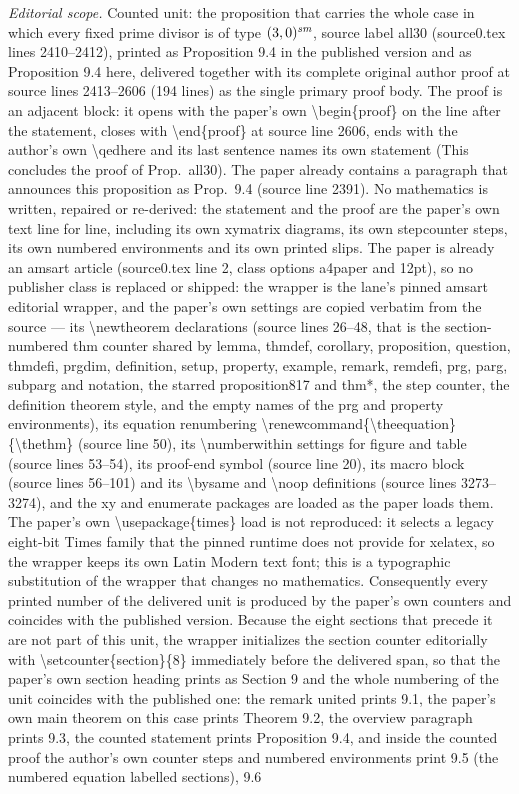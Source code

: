 \documentclass[10pt,a4paper]{amsart}
\theoremstyle{definition}
\numberwithin{figure}{section}
\numberwithin{table}{section}
\newcommand{\sm}{\text{\it sm}}
\begin{document}
\noindent\textit{Editorial scope.} Counted unit: the proposition that carries the whole case in which every fixed prime divisor is of type $(3,0)^{\sm}$, source label all30 (source0.tex lines 2410--2412), printed as Proposition 9.4 in the published version and as Proposition 9.4 here, delivered together with its complete original author proof at source lines 2413--2606 (194 lines) as the single primary proof body. The proof is an adjacent block: it opens with the paper's own \textbackslash{}begin\{proof\} on the line after the statement, closes with \textbackslash{}end\{proof\} at source line 2606, ends with the author's own \textbackslash{}qedhere and its last sentence names its own statement (This concludes the proof of Prop.~all30). The paper already contains a paragraph that announces this proposition as Prop.~9.4 (source line 2391). No mathematics is written, repaired or re-derived: the statement and the proof are the paper's own text line for line, including its own xymatrix diagrams, its own stepcounter steps, its own numbered environments and its own printed slips. The paper is already an amsart article (source0.tex line 2, class options a4paper and 12pt), so no publisher class is replaced or shipped: the wrapper is the lane's pinned amsart editorial wrapper, and the paper's own settings are copied verbatim from the source --- its \textbackslash{}newtheorem declarations (source lines 26--48, that is the section-numbered thm counter shared by lemma, thmdef, corollary, proposition, question, thmdefi, prgdim, definition, setup, property, example, remark, remdefi, prg, parg, subparg and notation, the starred proposition817 and thm*, the step counter, the definition theorem style, and the empty names of the prg and property environments), its equation renumbering \textbackslash{}renewcommand\{\textbackslash{}theequation\}\{\textbackslash{}thethm\} (source line 50), its \textbackslash{}numberwithin settings for figure and table (source lines 53--54), its proof-end symbol (source line 20), its macro block (source lines 56--101) and its \textbackslash{}bysame and \textbackslash{}noop definitions (source lines 3273--3274), and the xy and enumerate packages are loaded as the paper loads them. The paper's own \textbackslash{}usepackage\{times\} load is not reproduced: it selects a legacy eight-bit Times family that the pinned runtime does not provide for xelatex, so the wrapper keeps its own Latin Modern text font; this is a typographic substitution of the wrapper that changes no mathematics. Consequently every printed number of the delivered unit is produced by the paper's own counters and coincides with the published version. Because the eight sections that precede it are not part of this unit, the wrapper initializes the section counter editorially with \textbackslash{}setcounter\{section\}\{8\} immediately before the delivered span, so that the paper's own section heading prints as Section 9 and the whole numbering of the unit coincides with the published one: the remark united prints 9.1, the paper's own main theorem on this case prints Theorem 9.2, the overview paragraph prints 9.3, the counted statement prints Proposition 9.4, and inside the counted proof the author's own counter steps and numbered environments print 9.5 (the numbered equation labelled sections), 9.6 
\end{document}
